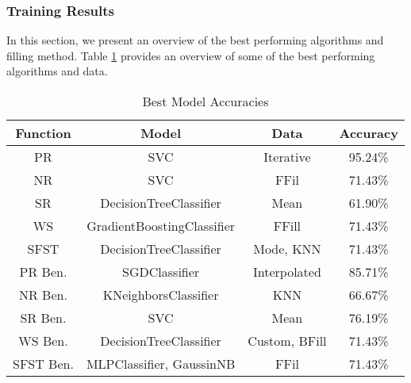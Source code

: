 \documentclass[12pt,letterpaper]{article}
\begin{document}
\subsubsection{Training Results}
In this section, we present an overview of the best performing algorithms and filling method.
Table \ref{tab_class:xtra_model_accuracies_best} provides an overview of some of the best performing algorithms and data.


\begin{table}[H]
\centering
\begin{tabular}{|c|c|c|c|}
\hline
\textbf{Function} & \textbf{Model} & \textbf{Data} & \textbf{Accuracy} \\
\hline

PR & SVC & Iterative & 95.24\% \\
\hline
NR & SVC & FFil & 71.43\% \\
\hline
SR & DecisionTreeClassifier & Mean & 61.90\% \\
\hline
WS & GradientBoostingClassifier & FFill & 71.43\% \\
\hline
SFST & DecisionTreeClassifier & Mode, KNN & 71.43\% \\
\hline
PR Ben. & SGDClassifier & Interpolated & 85.71\% \\
\hline
NR Ben. & KNeighborsClassifier & KNN & 66.67\% \\
\hline
SR Ben. & SVC & Mean & 76.19\% \\
\hline
WS Ben. & DecisionTreeClassifier & Custom, BFill & 71.43\% \\
\hline
SFST Ben. & MLPClassifier, GaussinNB & FFil & 71.43\% \\
\hline

\end{tabular}
\caption{Best Model Accuracies}
\label{tab_class:xtra_model_accuracies_best}
\end{table}
\end{document}
